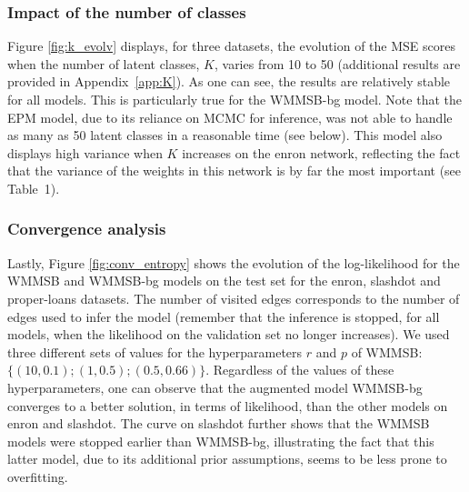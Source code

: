 \subsubsection{Impact of the number of classes} 

Figure \ref{fig:k_evolv} displays, for three datasets, the evolution of the MSE scores when the number of latent classes, $K$, varies from 10 to 50  (additional results are provided in Appendix~\ref{app:K}). As one can see, the results are relatively stable for all models. This is particularly true for the WMMSB-bg model. Note that the EPM model, due to its reliance on MCMC for inference, was not able to handle as many as 50 latent classes in a reasonable time (see below). This model also displays high variance when $K$ increases on the enron network, reflecting the fact that the variance of the weights in this network is by far the most important (see Table~1).


\subsubsection{Convergence analysis} 

Lastly, Figure \ref{fig:conv_entropy} shows the evolution of the log-likelihood for the WMMSB and WMMSB-bg models on the test set for the enron, slashdot and proper-loans datasets. The number of visited edges corresponds to the number of edges used to infer the model (remember that the inference is stopped, for all models, when the likelihood  on the validation set no longer increases). We used three different sets of values for the hyperparameters $r$ and $p$ of WMMSB: $\{(10,0.1); (1,0.5); (0.5,0.66)\}$. Regardless of the values of these hyperparameters, one can observe that the augmented model WMMSB-bg converges to a better solution, in terms of likelihood, than the other models on enron and slashdot. The curve on slashdot further shows that the WMMSB models were stopped earlier than WMMSB-bg, illustrating the fact that this latter model, due to its additional prior assumptions, seems to be less prone to overfitting.









